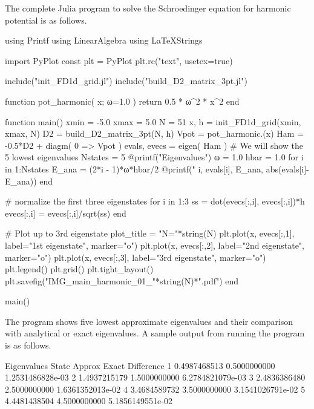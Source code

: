 The complete Julia program to solve the Schroedinger equation for harmonic potential
is as follows.

\begin{juliacode}
using Printf
using LinearAlgebra
using LaTeXStrings
  
import PyPlot
const plt = PyPlot
plt.rc("text", usetex=true)

include("init_FD1d_grid.jl")
include("build_D2_matrix_3pt.jl")
  
function pot_harmonic( x; ω=1.0 )
    return 0.5 * ω^2 * x^2
end
  
function main()
    xmin = -5.0
    xmax =  5.0
    N = 51
    x, h = init_FD1d_grid(xmin, xmax, N)
    D2 = build_D2_matrix_3pt(N, h)
    Vpot = pot_harmonic.(x)
    Ham = -0.5*D2 + diagm( 0 => Vpot )
    evals, evecs = eigen( Ham )
    # We will show the 5 lowest eigenvalues
    Nstates = 5
    @printf("Eigenvalues\n")
    ω = 1.0
    hbar = 1.0
    for i in 1:Nstates
        E_ana = (2*i - 1)*ω*hbar/2
        @printf("%
          i, evals[i], E_ana, abs(evals[i]-E_ana))
    end
  
    # normalize the first three eigenstates
    for i in 1:3
        ss = dot(evecs[:,i], evecs[:,i])*h
        evecs[:,i] = evecs[:,i]/sqrt(ss)
    end
  
    # Plot up to 3rd eigenstate
    plot_title = "N="*string(N)
    plt.plot(x, evecs[:,1],
      label="1st eigenstate", marker="o")
    plt.plot(x, evecs[:,2],
      label="2nd eigenstate", marker="o")
    plt.plot(x, evecs[:,3],
      label="3rd eigenstate", marker="o")
    plt.legend()
    plt.grid()
    plt.tight_layout()
    plt.savefig("IMG_main_harmonic_01_"*string(N)*".pdf")
end

main()
\end{juliacode}

The program shows five lowest approximate eigenvalues and their comparison with analytical or
exact eigenvalues. A sample output from running the program is as follows.
\begin{textcode}
Eigenvalues
State         Approx              Exact          Difference
   1       0.4987468513       0.5000000000   1.2531486828e-03
   2       1.4937215179       1.5000000000   6.2784821079e-03
   3       2.4836386480       2.5000000000   1.6361352013e-02
   4       3.4684589732       3.5000000000   3.1541026791e-02
   5       4.4481438504       4.5000000000   5.1856149551e-02 
\end{textcode}

